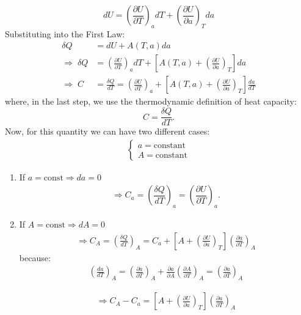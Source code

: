 \documentclass[12pt]{report}
\begin{document}
	\begin{equation}
		dU = \left(\frac{\partial U}{\partial T}\right)_a dT + \left(\frac{\partial U}{\partial a}\right)_T da
	\end{equation}
	Substituting into the First Law:
	\begin{align}
		\delta Q &= dU + A(T,a)da \\
		\Rightarrow\;\delta Q &= \left(\frac{\partial U}{\partial T}\right)_a dT + \left[A(T,a) + \left(\frac{\partial U}{\partial a}\right)_T\right]da\\
		\Rightarrow\;C &= \frac{\delta Q}{dT} = \left(\frac{\partial U}{\partial T}\right)_a + \left[A(T,a) + \left(\frac{\partial U}{\partial a}\right)_T\right]\frac{da}{dT}
	\end{align}
	where, in the last step, we use the thermodynamic definition of heat capacity:
	\begin{equation}
		C = \dfrac{\delta Q}{dT}.
	\end{equation}
	Now, for this quantity we can have two different cases:
	\begin{align*}
		\begin{cases}
			a = \text{constant} \\
			A = \text{constant}
		\end{cases}
	\end{align*}
	\begin{enumerate}
		\item If $a = \text{const} \Rightarrow da=0$
		\begin{align}
			\Rightarrow C_a=\left(\dfrac{\delta Q}{dT}\right)_a = \left(\dfrac{\partial U}{\partial T}\right)_a.
		\end{align}
		\item If $A = \text{const} \Rightarrow dA = 0$
		\begin{align}
			\Rightarrow C_A = \left(\frac{\delta Q}{d T}\right)_A = C_a + \left[A + \left(\frac{\partial U}{\partial a}\right)_T\right]\left(\frac{\partial a}{\partial T}\right)_A
		\end{align}
		because:
		\begin{align}
			\left(\frac{d a}{d T}\right)_A = \left(\frac{\partial a}{\partial T}\right)_A + \frac{\partial a}{\partial A}\left(\frac{\partial A}{\partial T}\right)_A = \left(\frac{\partial a}{\partial T}\right)_A
		\end{align}
		
		\begin{align}
			\Rightarrow \boxed{C_A - C_a = \left[A + \left(\frac{\partial U}{\partial a}\right)_T\right]\left(\frac{\partial a}{\partial T}\right)_A } 
		\end{align}
	\end{enumerate}
\end{document}
